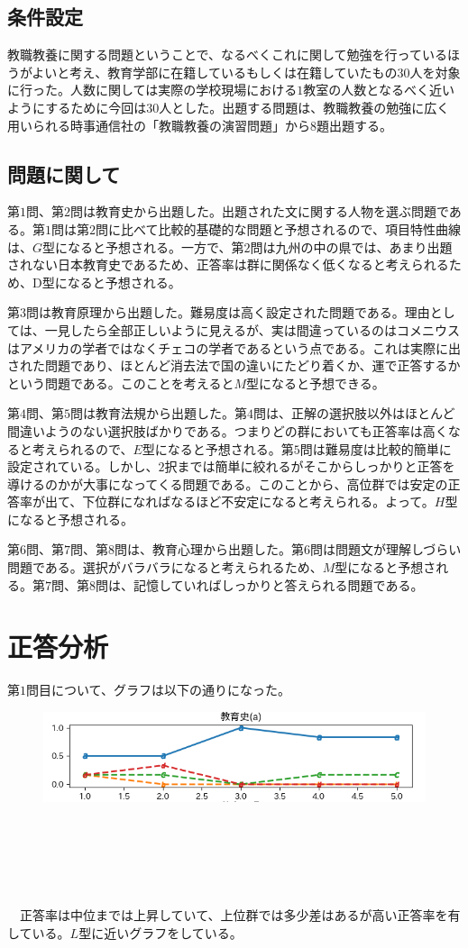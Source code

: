 \documentclass[12pt]{jarticle}
\begin{document}
\subsection{条件設定}
教職教養に関する問題ということで、なるべくこれに関して勉強を行っているほうがよいと考え、教育学部に在籍しているもしくは在籍していたもの$30$人を対象に行った。人数に関しては実際の学校現場における$1$教室の人数となるべく近いようにするために今回は$30$人とした。出題する問題は、教職教養の勉強に広く用いられる時事通信社の「教職教養の演習問題」から$8$題出題する。
\subsection{問題に関して}
第$1$問、第$2$問は教育史から出題した。出題された文に関する人物を選ぶ問題である。第$1$問は第$2$問に比べて比較的基礎的な問題と予想されるので、項目特性曲線は、$G$型になると予想される。一方で、第$2$問は九州の中の県では、あまり出題されない日本教育史であるため、正答率は群に関係なく低くなると考えられるため、D型になると予想される。

第$3$問は教育原理から出題した。難易度は高く設定された問題である。理由としては、一見したら全部正しいように見えるが、実は間違っているのはコメニウスはアメリカの学者ではなくチェコの学者であるという点である。これは実際に出された問題であり、ほとんど消去法で国の違いにたどり着くか、運で正答するかという問題である。このことを考えると$M$型になると予想できる。

第$4$問、第$5$問は教育法規から出題した。第$4$問は、正解の選択肢以外はほとんど間違いようのない選択肢ばかりである。つまりどの群においても正答率は高くなると考えられるので、$E$型になると予想される。第$5$問は難易度は比較的簡単に設定されている。しかし、$2$択までは簡単に絞れるがそこからしっかりと正答を導けるのかが大事になってくる問題である。このことから、高位群では安定の正答率が出て、下位群になればなるほど不安定になると考えられる。よって。$H$型になると予想される。

第$6$問、第$7$問、第$8$問は、教育心理から出題した。第$6$問は問題文が理解しづらい問題である。選択がバラバラになると考えられるため、$M$型になると予想される。第$7$問、第$8$問は、記憶していればしっかりと答えられる問題である。
\newpage
\section{正答分析}
第$1$問目について、グラフは以下の通りになった。
\begin{figure}[H]
  \includegraphics[bb = -7 60 1 1,scale = 1.5]{Figure_1.png}
\end{figure}
\leavevmode \\
\\
\\
\\
\\
\ \ 正答率は中位までは上昇していて、上位群では多少差はあるが高い正答率を有している。$L$型に近いグラフをしている。
\end{document}
